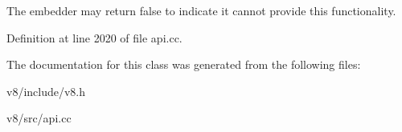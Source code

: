 The embedder may return \textquotesingle{}false\textquotesingle{} to indicate it cannot provide this functionality. 

Definition at line 2020 of file api.\+cc.



The documentation for this class was generated from the following files\+:\begin{DoxyCompactItemize}
\item 
v8/include/v8.\+h\item 
v8/src/api.\+cc\end{DoxyCompactItemize}
